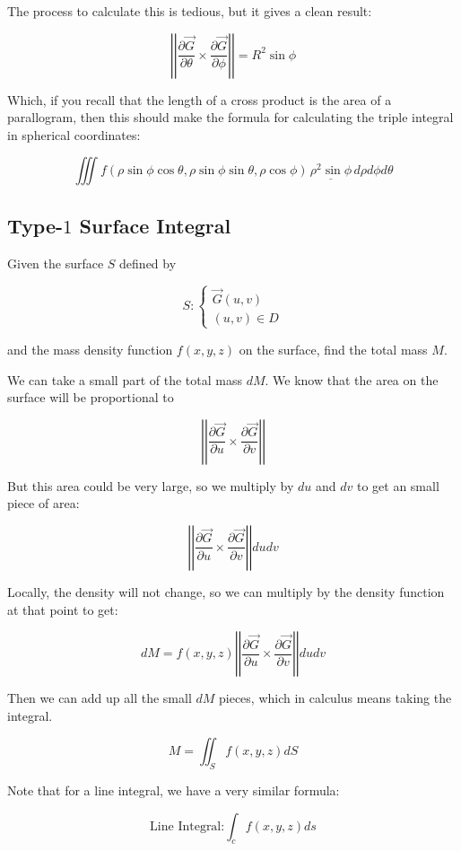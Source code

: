 \documentclass{article}
\newcommand{\norm}[1]{\left|\left|#1\right|\right|}
\begin{document}
The process to calculate this is tedious, but it gives a clean result:

\[
\norm{\dfrac{\partial \vec{G}}{\partial \theta} \times \dfrac{\partial \vec{G}}{\partial \phi}} = R^2 \sin{\phi}
\]

Which, if you recall that the length of a cross product is the area of a parallogram, then this should make the formula for calculating the triple integral in spherical coordinates:

\[
\iiint f(\rho \sin{\phi} \cos{\theta}, \rho \sin{\phi} \sin{\theta}, \rho \cos{\phi}) \, \underline{\rho^2 \sin{\phi}} \, d\rho d\phi d\theta
\]

\subsection*{Type-$1$ Surface Integral}

Given the surface $S$ defined by

\[
S: \begin{cases}
  \vec{G}(u,v) \\
  (u,v) \in D
\end{cases}
\]

and the mass density function $f(x,y,z)$ on the surface, find the total mass $M$.

We can take a small part of the total mass $dM$. We know that the area on the surface will be proportional to

\[
\norm{\dfrac{\partial \vec{G}}{\partial u} \times \dfrac{\partial \vec{G}}{\partial v}}
\]

But this area could be very large, so we multiply by $du$ and $dv$ to get an small piece of area:

\[
\norm{\dfrac{\partial \vec{G}}{\partial u} \times \dfrac{\partial \vec{G}}{\partial v}} du dv
\]

Locally, the density will not change, so we can multiply by the density function at that point to get:

\[
dM = f(x,y,z) \norm{\dfrac{\partial \vec{G}}{\partial u} \times \dfrac{\partial \vec{G}}{\partial v}} du dv
\]

Then we can add up all the small $dM$ pieces, which in calculus means taking the integral.

\[
M = \iint_S f(x,y,z) dS
\]

Note that for a line integral, we have a very similar formula:

\[
  \text{Line Integral:} \int_c f(x,y,z) ds
\]
\end{document}
